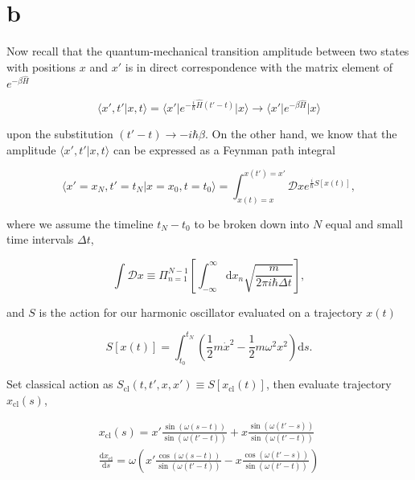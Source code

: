 \section*{b}

Now recall that the quantum-mechanical transition amplitude between two states with positions $x$ and $x'$ is in direct correspondence with the matrix element of $e^{-\beta\hat{H}}$

\begin{equation}
    \langle x',t'|x,t\rangle = \langle x'|e^{-\frac{i}{\hbar}\hat{H}(t'-t)}|x\rangle \rightarrow \langle x'|e^{-\beta\hat{H}}|x\rangle
\end{equation}

upon the substitution $(t'-t)\rightarrow -i\hbar\beta$. On the other hand, we know that the amplitude $\langle x',t'|x,t\rangle$ can be expressed as a Feynman path integral

\begin{equation}
    \langle x'=x_N,t'=t_N|x=x_0,t=t_0\rangle = \int_{x(t)=x}^{x(t')=x'}\mathcal{D}x e^{\frac{i}{\hbar}S[x(t)]} \label{eq:1}, 
\end{equation}

where we assume the timeline $t_N-t_0$ to be broken down into $N$ equal and small time intervals $\Delta t$,

\begin{equation}
    \int\mathcal{D}x \equiv \Pi_{n=1}^{N-1}\left[\int_{-\infty}^\infty\mathrm{d}x_n\sqrt{\frac{m}{2\pi i\hbar\Delta t}}\right],
\end{equation}

and $S$ is the action for our harmonic oscillator evaluated on a trajectory $x(t)$

\begin{equation}
    S[x(t)] = \int_{t_0}^{t_N}\left(\frac{1}{2}m\dot{x}^2-\frac{1}{2}m\omega^2x^2\right)\mathrm{d}s.
\end{equation}

Set classical action as $S_{\mathrm{cl}}(t,t',x,x') \equiv S[x_{\mathrm{cl}}(t)]$, then evaluate trajectory $x_{\mathrm{cl}}(s)$,

\begin{align}
    x_{\mathrm{cl}}(s) = x'\frac{\sin(\omega (s-t))}{\sin(\omega (t'-t))} + x\frac{\sin(\omega (t'-s))}{\sin(\omega (t'-t))} \\
    \frac{\mathrm{d}x_{\mathrm{cl}}}{\mathrm{d}s} = \omega\left(x'\frac{\cos(\omega (s-t))}{\sin(\omega (t'-t))} - x\frac{\cos(\omega (t'-s))}{\sin(\omega (t'-t))}\right)
\end{align}

